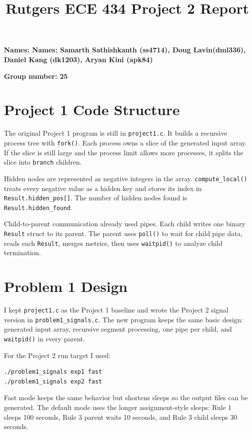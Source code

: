 \documentclass[11pt]{article}
\title{Rutgers ECE 434 Project 2 Report}
\author{}
\date{}
\begin{document}
\maketitle

\textbf{Names: Names: Samarth Sathishkanth (ss4714), Doug Lavin(dml336), Daniel Kang (dk1203), Aryan Kini (apk84)}

\textbf{Group number: 25}


\section{Project 1 Code Structure}

The original Project 1 program is still in \texttt{project1.c}. It builds a recursive
process tree with \texttt{fork()}. Each process owns a slice of the generated input
array. If the slice is still large and the process limit allows more processes, it
splits the slice into \texttt{branch} children.

Hidden nodes are represented as negative integers in the array. \texttt{compute\_local()}
treats every negative value as a hidden key and stores its index in
\texttt{Result.hidden\_pos[]}. The number of hidden nodes found is
\texttt{Result.hidden\_found}.

Child-to-parent communication already used pipes. Each child writes one binary
\texttt{Result} struct to its parent. The parent uses \texttt{poll()} to wait for child
pipe data, reads each \texttt{Result}, merges metrics, then uses \texttt{waitpid()} to
analyze child termination.

\section{Problem 1 Design}

I kept \texttt{project1.c} as the Project 1 baseline and wrote the Project 2 signal
version in \texttt{problem1\_signals.c}. The new program keeps the same basic design:
generated input array, recursive segment processing, one pipe per child, and
\texttt{waitpid()} in every parent.

For the Project 2 run target I used:

\begin{verbatim}
./problem1_signals exp1 fast
./problem1_signals exp2 fast
\end{verbatim}

Fast mode keeps the same behavior but shortens sleeps so the output files can be
generated. The default mode uses the longer assignment-style sleeps: Rule 1 sleeps
100 seconds, Rule 3 parent waits 10 seconds, and Rule 3 child sleeps 30 seconds.
\end{document}
